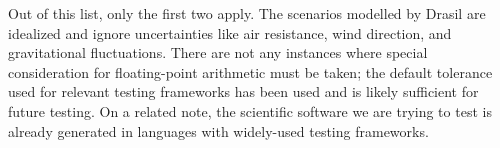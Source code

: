 Out of this list, only the first two apply. The scenarios modelled by Drasil
are idealized and ignore uncertainties like air resistance, wind direction,
and gravitational fluctuations. There are not any instances where special
consideration for floating-point arithmetic must be taken; the default
tolerance used for relevant testing frameworks has been used
 and is likely sufficient for future testing. On a related
note, the scientific software we are trying to test is already generated in
languages with widely-used testing frameworks. 